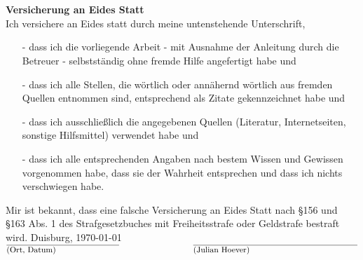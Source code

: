 
\ 

\cleardoublepage

\ 


\pagestyle{empty}

\textbf{Versicherung an Eides Statt}\\

Ich versichere an Eides statt durch meine untenstehende Unterschrift,
\begin{itemize}
\item[-] dass ich die vorliegende Arbeit - mit Ausnahme der Anleitung durch die Betreuer - selbstständig ohne fremde Hilfe angefertigt habe und
\item[-] dass ich alle Stellen, die wörtlich oder annähernd wörtlich aus fremden Quellen entnommen sind, entsprechend als Zitate gekennzeichnet habe und
\item[-] dass ich ausschließlich die angegebenen Quellen (Literatur, Internetseiten, sonstige Hilfsmittel) verwendet habe und
\item[-] dass ich alle entsprechenden Angaben nach bestem Wissen und Gewissen vorgenommen habe, dass sie der Wahrheit entsprechen und dass ich nichts verschwiegen habe.
\end{itemize}
Mir ist bekannt, dass eine falsche Versicherung an Eides Statt nach \S 156 und \S 163 Abs. 1 des Strafgesetzbuches mit Freiheitsstrafe oder Geldstrafe bestraft wird.
\vfill
Duisburg, \today\\
$\overline{\parbox{4.8cm}{(Ort, Datum)}} ~~~~~~~~~~~~~~~~~~~~~~~~~~~ \overline{\parbox{7cm}{(Julian Hoever)}}$
